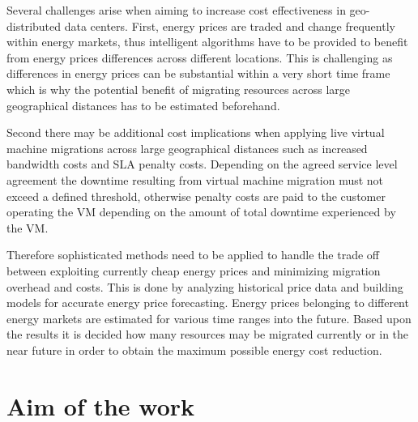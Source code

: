Several challenges arise when aiming to increase cost effectiveness in geo-distributed data centers. First, energy prices are traded and change frequently within energy markets, thus intelligent algorithms have to be provided to benefit from energy prices differences across different locations. This is challenging as differences in energy prices can be substantial within a very short time frame which is why the potential benefit of migrating resources across large geographical distances has to be estimated beforehand. 

Second there may be additional cost implications when applying live virtual machine migrations across large geographical distances such as increased bandwidth costs and SLA penalty costs. Depending on the agreed service level agreement the downtime resulting from virtual machine migration must not exceed a defined threshold, otherwise penalty costs are paid to the customer operating the VM depending on the amount of total downtime experienced by the VM. 

Therefore sophisticated methods need to be applied to handle the trade off between exploiting currently cheap energy prices and minimizing migration overhead and costs. This is done by analyzing historical price data and building models for accurate energy price forecasting. Energy prices belonging to different energy markets are estimated for various time ranges into the future. Based upon the results it is decided how many resources may be migrated currently or in the near future in order to obtain the maximum possible energy cost reduction. 




\section{Aim of the work}

